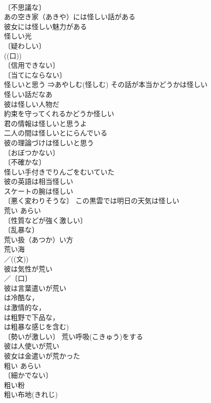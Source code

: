 \documentclass[8pt]{extreport}
\begin{document}
\begin{CJK}{UTF8}{min}
\\	〔不思議な〕
\\	あの空き家（あきや）には怪しい話がある 
\\	彼女には怪しい魅力がある 
\\	怪しい光 
\\	〔疑わしい〕
\\	((口)) 
\\	〔信用できない〕
\\	〔当てにならない〕
\\	怪しいと思う ⇒あやしむ(怪しむ) その話が本当かどうかは怪しい 
\\	怪しい話だなあ 
\\	彼は怪しい人物だ 
\\	約束を守ってくれるかどうか怪しい 
\\	君の情報は怪しいと思うよ 
\\	二人の間は怪しいとにらんでいる 
\\	彼の理論づけは怪しいと思う 
\\	〔おぼつかない〕
\\	〔不確かな〕
\\	怪しい手付きでりんごをむいていた 
\\	彼の英語は相当怪しい 
\\	スケートの腕は怪しい 
\\	〔悪く変わりそうな〕 この黒雲では明日の天気は怪しい 
\\	荒い	あらい	
\\	〔性質などが強く激しい〕
\\	〔乱暴な〕
\\	荒い扱（あつか）い方 
\\	荒い海 
\\	／((文))
\\	彼は気性が荒い 
\\	／〔口〕
\\	彼は言葉遣いが荒い 
\\	は冷酷な，
\\	は激情的な，
\\	は粗野で下品な，
\\	は粗暴な感じを含む) 
\\	〔勢いが激しい〕 荒い呼吸(こきゅう)をする 
\\	彼は人使いが荒い 
\\	彼女は金遣いが荒かった 
\\	粗い	あらい	
\\	〔細かでない〕
\\	粗い粉 
\\	粗い布地(きれじ) 

\end{CJK}
\end{document}
